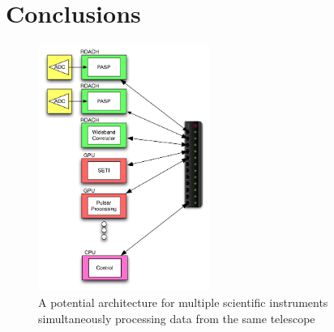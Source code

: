 \chapter{Conclusions}
\label{chap:Conclusions}


\begin{figure}[ht!]
  \centering
    \includegraphics[width=0.5\textwidth]{Images/C5/universal_arch.png}
  \caption{A potential architecture for multiple scientific instruments simultaneously processing data from the same telescope}
  \label{fig: C5/universal_arch.png}
\end{figure}